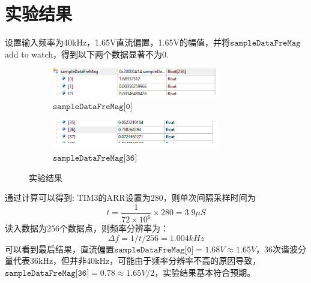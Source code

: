 \documentclass{article}
\begin{document}
\section{实验结果}
设置输入频率为40kHz，1.65V直流偏置，1.65V的幅值，并将$\texttt{sampleDataFreMag}$ add to watch，得到以下两个数据显著不为0.
\begin{figure}[H]
    \begin{subfigure}{0.5\textwidth}
        \centering
        \includegraphics[width=0.8\textwidth]{assets/1.png}
        \caption{$\texttt{sampleDataFreMag[0]}$}
    \end{subfigure}
    \begin{subfigure}{0.5\textwidth}
        \centering
        \includegraphics[width=0.8\textwidth]{assets/2.png}
        \caption{$\texttt{sampleDataFreMag[36]}$}
    \end{subfigure}
    \caption{实验结果}
\end{figure}
通过计算可以得到:\newline
TIM3的ARR设置为280，则单次间隔采样时间为
$$
t=\frac1{72\times 10^6}\times 280=3.9\mu S
$$
读入数据为256个数据点，则频率分辨率为：
$$
\Delta f = 1/t/256=1.004kHz
$$
可以看到最后结果，直流偏置$\texttt{sampleDataFreMag[0]}=1.68V\approx1.65V$，36次谐波分量代表36kHz，但并非40kHz，可能由于频率分辨率不高的原因导致，
$\texttt{sampleDataFreMag[36]}=0.78\approx1.65V/2$，实验结果基本符合预期。
\end{document}
